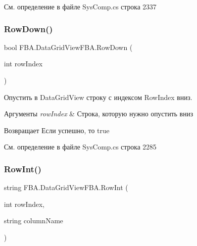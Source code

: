 См. определение в файле Sys\+Comp.\+cs строка 2337

\mbox{\label{class_f_b_a_1_1_data_grid_view_f_b_a_a250c5d0090497b0490f6971a86cd8ed0}} 
\subsubsection{\texorpdfstring{Row\+Down()}{RowDown()}}
{\footnotesize\ttfamily bool F\+B\+A.\+Data\+Grid\+View\+F\+B\+A.\+Row\+Down (\begin{DoxyParamCaption}\item[{int}]{row\+Index }\end{DoxyParamCaption})}



Опустить в Data\+Grid\+View строку с индексом Row\+Index вниз. 


\begin{DoxyParams}{Аргументы}
{\em row\+Index} & Строка, которую нужно опустить вниз\\
\hline
\end{DoxyParams}
\begin{DoxyReturn}{Возвращает}
Если успешно, то true
\end{DoxyReturn}


См. определение в файле Sys\+Comp.\+cs строка 2285

\mbox{\label{class_f_b_a_1_1_data_grid_view_f_b_a_a0205d4009ab40c597292f0d0979a05d7}} 
\subsubsection{\texorpdfstring{Row\+Int()}{RowInt()}\hspace{0.1cm}{\footnotesize\ttfamily [1/2]}}
{\footnotesize\ttfamily string F\+B\+A.\+Data\+Grid\+View\+F\+B\+A.\+Row\+Int (\begin{DoxyParamCaption}\item[{int}]{row\+Index,  }\item[{string}]{column\+Name }\end{DoxyParamCaption})}



